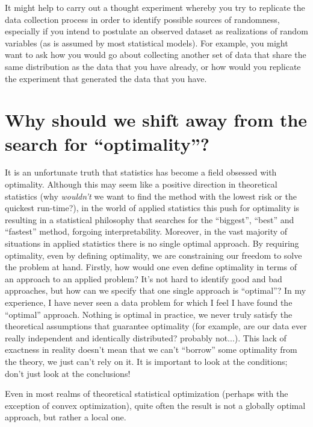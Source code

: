 It might help to carry out a thought experiment whereby you try to replicate the data collection process in order to identify possible sources of randomness, especially if you intend to postulate an observed dataset as realizations of random variables (as is assumed by most statistical models). For example, you might want to ask how you would go about collecting another set of data that share the same distribution as the data that you have already, or how would you replicate the experiment that generated the data that you have.

\section{Why should we shift away from the search for ``optimality''?}

It is an unfortunate truth that statistics has become a field obsessed with optimality. Although this may seem like a positive direction in theoretical statistics (why \emph{wouldn't} we want to find the method with the lowest risk or the quickest run-time?), in the world of applied statistics this push for optimality is resulting in a statistical philosophy that searches for the ``biggest'', ``best'' and ``fastest'' method, forgoing interpretability. Moreover, in the vast majority of situations in applied statistics there is no single optimal approach. By requiring optimality, even by defining optimality, we are constraining our freedom to solve the problem at hand. Firstly, how would one even define optimality in terms of an approach to an applied problem? It's not hard to identify good and bad approaches, but how can we specify that one single approach is ``optimal''? In my experience, I have never seen a data problem for which I feel I have found the ``optimal'' approach. Nothing is optimal in practice, we never truly satisfy the theoretical assumptions that guarantee optimality (for example, are our data ever really independent and identically distributed? probably not...). This lack of exactness in reality doesn't mean that we can't ``borrow'' some optimality from the theory, we just can't rely on it. It is important to look at the conditions; don't just look at the conclusions!

Even in most realms of theoretical statistical optimization (perhaps with the exception of convex optimization), quite often the result is not a globally optimal approach, but rather a local one.





